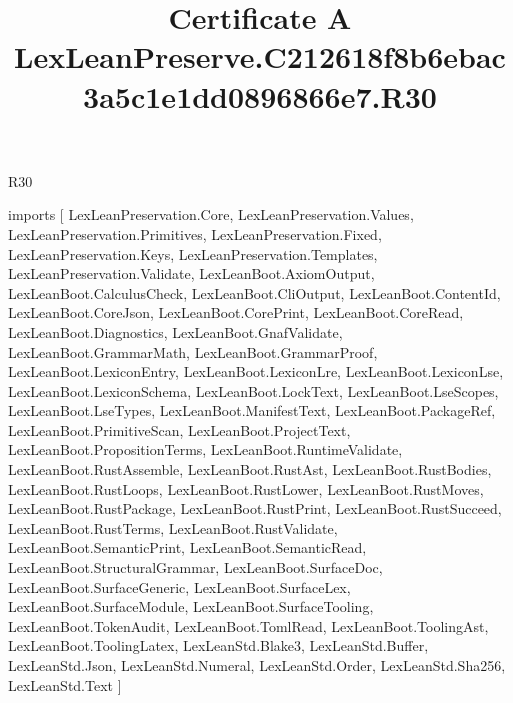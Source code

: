 \begin{lexlean}{R30}
\title{Certificate A LexLeanPreserve.C212618f8b6ebac3a5c1e1dd0896866e7.R30}
\begin{coremodule}
imports [
  LexLeanPreservation.Core,
  LexLeanPreservation.Values,
  LexLeanPreservation.Primitives,
  LexLeanPreservation.Fixed,
  LexLeanPreservation.Keys,
  LexLeanPreservation.Templates,
  LexLeanPreservation.Validate,
  LexLeanBoot.AxiomOutput,
  LexLeanBoot.CalculusCheck,
  LexLeanBoot.CliOutput,
  LexLeanBoot.ContentId,
  LexLeanBoot.CoreJson,
  LexLeanBoot.CorePrint,
  LexLeanBoot.CoreRead,
  LexLeanBoot.Diagnostics,
  LexLeanBoot.GnafValidate,
  LexLeanBoot.GrammarMath,
  LexLeanBoot.GrammarProof,
  LexLeanBoot.LexiconEntry,
  LexLeanBoot.LexiconLre,
  LexLeanBoot.LexiconLse,
  LexLeanBoot.LexiconSchema,
  LexLeanBoot.LockText,
  LexLeanBoot.LseScopes,
  LexLeanBoot.LseTypes,
  LexLeanBoot.ManifestText,
  LexLeanBoot.PackageRef,
  LexLeanBoot.PrimitiveScan,
  LexLeanBoot.ProjectText,
  LexLeanBoot.PropositionTerms,
  LexLeanBoot.RuntimeValidate,
  LexLeanBoot.RustAssemble,
  LexLeanBoot.RustAst,
  LexLeanBoot.RustBodies,
  LexLeanBoot.RustLoops,
  LexLeanBoot.RustLower,
  LexLeanBoot.RustMoves,
  LexLeanBoot.RustPackage,
  LexLeanBoot.RustPrint,
  LexLeanBoot.RustSucceed,
  LexLeanBoot.RustTerms,
  LexLeanBoot.RustValidate,
  LexLeanBoot.SemanticPrint,
  LexLeanBoot.SemanticRead,
  LexLeanBoot.StructuralGrammar,
  LexLeanBoot.SurfaceDoc,
  LexLeanBoot.SurfaceGeneric,
  LexLeanBoot.SurfaceLex,
  LexLeanBoot.SurfaceModule,
  LexLeanBoot.SurfaceTooling,
  LexLeanBoot.TokenAudit,
  LexLeanBoot.TomlRead,
  LexLeanBoot.ToolingAst,
  LexLeanBoot.ToolingLatex,
  LexLeanStd.Blake3,
  LexLeanStd.Buffer,
  LexLeanStd.Json,
  LexLeanStd.Numeral,
  LexLeanStd.Order,
  LexLeanStd.Sha256,
  LexLeanStd.Text
]


\end{coremodule}
\end{lexlean}
